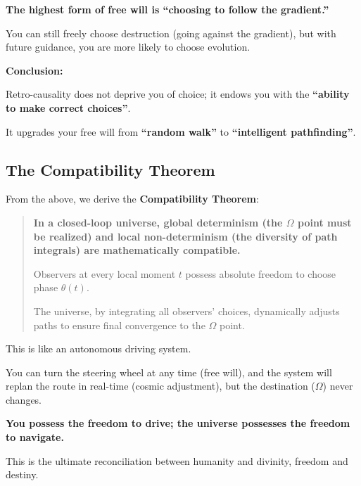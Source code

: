 \textbf{The highest form of free will is ``choosing to follow the gradient.''}

You can still freely choose destruction (going against the gradient), but with future guidance, you are more likely to choose evolution.

\textbf{Conclusion:}

Retro-causality does not deprive you of choice; it endows you with the \textbf{``ability to make correct choices''}.

It upgrades your free will from \textbf{``random walk''} to \textbf{``intelligent pathfinding''}.

\subsection{The Compatibility Theorem}

From the above, we derive the \textbf{Compatibility Theorem}:

\begin{quote}
\textbf{In a closed-loop universe, global determinism (the $\Omega$ point must be realized) and local non-determinism (the diversity of path integrals) are mathematically compatible.}

Observers at every local moment $t$ possess absolute freedom to choose phase $\theta(t)$.

The universe, by integrating all observers' choices, dynamically adjusts paths to ensure final convergence to the $\Omega$ point.
\end{quote}

This is like an autonomous driving system.

You can turn the steering wheel at any time (free will), and the system will replan the route in real-time (cosmic adjustment), but the destination ($\Omega$) never changes.

\textbf{You possess the freedom to drive; the universe possesses the freedom to navigate.}

This is the ultimate reconciliation between humanity and divinity, freedom and destiny.

